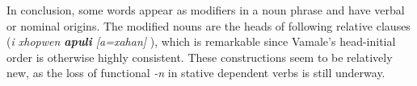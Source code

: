 In conclusion, some words appear as modifiers in a noun phrase and have verbal or nominal origins. %
The modified nouns are the heads of following relative clauses (\textit{i xhopwen \textbf{apuli} {[}a=xahan]} ), which is remarkable since Vamale's head-initial order is otherwise highly consistent. These constructions seem to be relatively new, as the loss of functional \textit{-n} in stative dependent verbs is still underway. 



